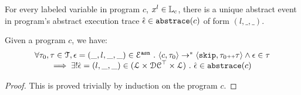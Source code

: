   For every labeled variable in program $c$, $x^l \in \mathbb{L}_c$, there is a unique abstract event in program's abstract execution trace $\hat{\mathtt{\epsilon}{}} \in \mathtt{abs}{\mathtt{trace}}(c)$ of form $(l, \_, \_)$. 
  \begin{lem}
  Given a program ${c}$, we have:
  \[
  \begin{array}{l}
   \forall \mathtt{\tau}_0, \mathtt{\tau} \in \mathcal{T} ,  \mathtt{\epsilon} = (\_, l, \_, \_) \in \mathcal{E}^{\mathtt{{asn}}} ~.~
  \langle {c}, \mathtt{\tau}_0 \rangle \to^{*} \langle \mathtt{skip}, \mathtt{\tau}_0 {\scriptscriptstyle ++} \mathtt{\tau} \rangle 
  \land \mathtt{\epsilon} \in \mathtt{\tau} 
  \\
  \qquad \implies \exists! \hat{\mathtt{\epsilon}{}} = (l, \_, \_) \in (\mathcal{L}\times \mathcal{DC}^{\top} \times \mathcal{L}) ~.~ 
  \hat{\mathtt{\epsilon}{}} \in \mathtt{abs}{\mathtt{trace}}(c)
  \end{array}
  \]
  \end{lem}
  \begin{proof}
    This is proved trivially by induction on the program $c$.
  \end{proof}